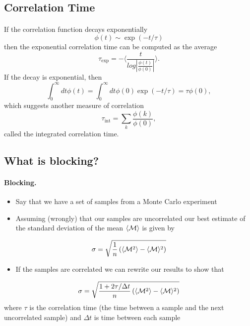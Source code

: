 \documentclass[%
twoside,                 %
final,                   %
10pt]{article}
\begin{document}
\subsection*{Correlation Time}

\paragraph{}

If the correlation function decays exponentially
\[ \phi (t) \sim \exp{(-t/\tau)}\]
then the exponential correlation time can be computed as the average
\[   \tau_{\mathrm{exp}}  =  -\langle  \frac{t}{log|\frac{\phi(t)}{\phi(0)}|} \rangle. \]
If the decay is exponential, then
\[  \int_0^{\infty} dt \phi(t)  = \int_0^{\infty} dt \phi(0)\exp{(-t/\tau)}  = \tau \phi(0),\] 
which  suggests another measure of correlation
\[   \tau_{\mathrm{int}} = \sum_k \frac{\phi(k)}{\phi(0)}, \]
called the integrated correlation time.




\subsection*{What is blocking?}

\paragraph{Blocking.}
\begin{itemize}
    \item Say that we have a set of samples from a Monte Carlo experiment

    \item Assuming (wrongly) that our samples are uncorrelated our best estimate of the standard deviation of the mean $\langle {\cal M}\rangle$ is given by
\end{itemize}

\noindent
\[
\sigma=\sqrt{\frac{1}{n}\left(\langle {\cal M}^2\rangle-\langle {\cal M}\rangle^2\right)} 
\]
\begin{itemize}
    \item If the samples are correlated we can rewrite our results to show  that
\end{itemize}

\noindent
\[
\sigma=\sqrt{\frac{1+2\tau/\Delta t}{n}\left(\langle {\cal M}^2\rangle-\langle {\cal M}\rangle^2\right)}
\]
      where $\tau$ is the correlation time (the time between a sample and the next uncorrelated sample) and $\Delta t$ is time between each sample
\end{document}
